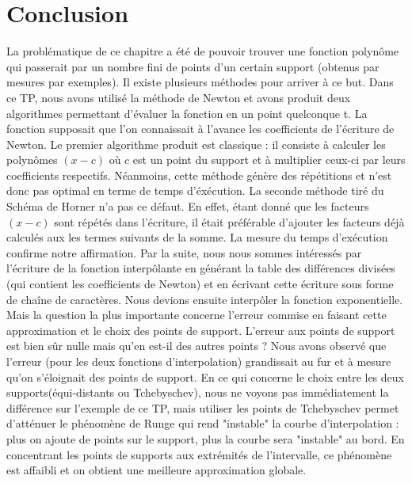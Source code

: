 \documentclass[a4paper,10pt]{report}
\begin{document}
\chapter*{Conclusion}

La problématique de ce chapitre a été de pouvoir trouver une fonction polynôme qui passerait par un nombre fini de points d’un certain support (obtenus par mesures par exemples). Il existe plusieurs méthodes pour arriver à ce but.
\newline
\newline
Dans ce TP, nous avons utilisé la méthode de Newton et avons produit deux algorithmes permettant d’évaluer la fonction en un point quelconque t. La fonction supposait que l’on connaissait à l’avance les coefficients de l’écriture de Newton.
\newline
\newline
Le premier algorithme produit est classique : il consiste à calculer les polynômes $(x-c)$ où $c$ est un point du support et à multiplier ceux-ci par leurs coefficients respectifs. Néanmoins, cette méthode génère des répétitions et n’est donc pas optimal en terme de temps d’éxécution.
\newline
\newline 
La seconde méthode tiré du Schéma de Horner n’a pas ce défaut. En effet, étant donné que les facteurs $(x-c)$ sont répétés dans l’écriture, il était préférable d’ajouter les facteurs déjà calculés aux les termes suivants de la somme.
\newline
\newline
La mesure du temps d’exécution confirme notre affirmation.
\newline
\newline
Par la suite, nous nous sommes intéressés par l’écriture de la fonction interpôlante en générant la table des différences divisées (qui contient les coefficients de Newton) et en écrivant cette écriture sous forme de chaîne de caractères. Nous devions ensuite interpôler la fonction exponentielle. 
\newline
\newline
Mais la question la plus importante concerne l’erreur commise en faisant cette approximation et le choix des points de support. L’erreur aux points de support est bien sûr nulle mais qu’en est-il des autres points ? 
\newline
\newline
Nous avons observé que l’erreur (pour les deux fonctions d'interpolation) grandissait au fur et à mesure qu’on s’éloignait des points de support. En ce qui concerne le choix entre les deux supports(équi-distants ou Tchebyschev), nous ne voyons pas immédiatement la différence sur l'exemple de ce TP, mais utiliser les points de Tchebyschev permet d'atténuer le phénomène de Runge qui rend "instable" la courbe d'interpolation : plus on ajoute de points sur le support, plus la courbe sera "instable" au bord. En concentrant les points de supports aux extrémités de l'intervalle, ce phénomène est affaibli et on obtient une meilleure approximation globale. 
\end{document}
